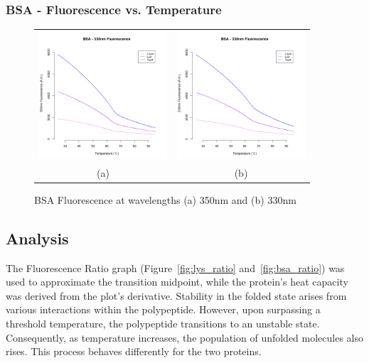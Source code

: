 \documentclass[a4paper,11pt]{article}
\begin{document}
            \subsubsection*{BSA - Fluorescence vs. Temperature}
                \begin{figure}[H]
                    \centering
                    \begin{tabular}{cc}
                        \includegraphics[width=180px]{../resources/unfolding_BSA_350.png} &
                        \includegraphics[width=180px]{../resources/unfolding_BSA_330.png} \\
                        (a) & (b)\\
                    \end{tabular}
                    \caption{BSA Fluorescence at wavelengths (a) 350nm and (b) 330nm}\label{fig:bsa_flr}
                \end{figure}

        \subsection*{Analysis}
            The Fluorescence Ratio graph (Figure~\ref{fig:lys_ratio} and~\ref{fig:bsa_ratio}) was used to 
            approximate the transition midpoint, while the protein's heat capacity was derived from the 
            plot's derivative. 
            Stability in the folded state arises from various interactions within the polypeptide. 
            However, upon surpassing a threshold temperature, the polypeptide 
            transitions to an unstable state. Consequently, as temperature increases, the population 
            of unfolded molecules also rises. This process behaves differently for the two proteins. 
\end{document}
